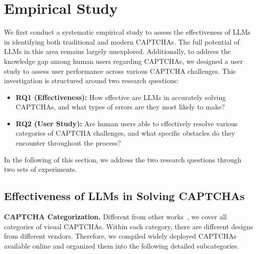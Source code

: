 



\section{Empirical Study}
\label{sec:empirical_study}

We first conduct a systematic empirical study to assess the effectiveness of LLMs in identifying both traditional and modern CAPTCHAs. The full potential of LLMs in this area remains largely unexplored. Additionally, to address the knowledge gap among human users regarding CAPTCHAs, we designed a user study to assess user performance across various CAPTCHA challenges. This investigation is structured around two research questions:

\begin{itemize}[leftmargin=*]
    \setlength\itemsep{0pt}
    \item \textbf{RQ1 (Effectiveness):} How effective are LLMs in accurately solving CAPTCHAs, and what types of errors are they most likely to make?
    \item \textbf{RQ2 (User Study):} Are human users able to effectively resolve various categories of CAPTCHA challenges, and what specific obstacles do they encounter throughout the process?
\end{itemize}

In the following of this section, we address the two research questions through two sets of experiments. 

\subsection{Effectiveness of LLMs in Solving CAPTCHAs}



\noindent\textbf{CAPTCHA Categorization.} Different from other works~\cite{deng2024oedipus,searles2023empirical}, we cover all categories of visual CAPTCHAs. Within each category, there are different designs from different vendors. Therefore, we compiled widely deployed CAPTCHAs available online and organized them into the following detailed subcategories.

